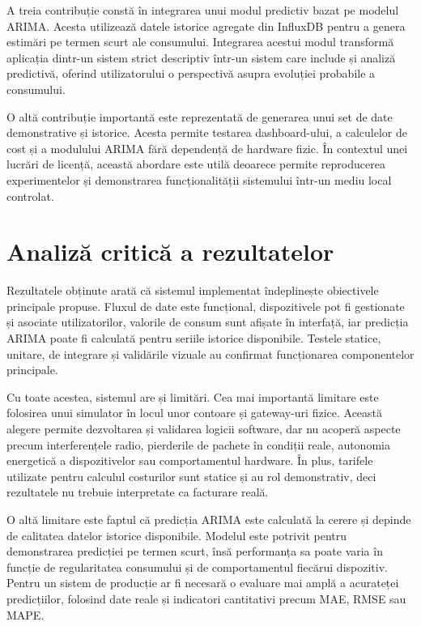A treia contribuție constă în integrarea unui modul predictiv bazat pe modelul ARIMA. Acesta utilizează datele istorice agregate din InfluxDB pentru a genera estimări pe termen scurt ale consumului. Integrarea acestui modul transformă aplicația dintr-un sistem strict descriptiv într-un sistem care include și analiză predictivă, oferind utilizatorului o perspectivă asupra evoluției probabile a consumului.

O altă contribuție importantă este reprezentată de generarea unui set de date demonstrative și istorice. Acesta permite testarea dashboard-ului, a calculelor de cost și a modulului ARIMA fără dependență de hardware fizic. În contextul unei lucrări de licență, această abordare este utilă deoarece permite reproducerea experimentelor și demonstrarea funcționalității sistemului într-un mediu local controlat.

\section{Analiză critică a rezultatelor}

Rezultatele obținute arată că sistemul implementat îndeplinește obiectivele principale propuse. Fluxul de date este funcțional, dispozitivele pot fi gestionate și asociate utilizatorilor, valorile de consum sunt afișate în interfață, iar predicția ARIMA poate fi calculată pentru seriile istorice disponibile. Testele statice, unitare, de integrare și validările vizuale au confirmat funcționarea componentelor principale.

Cu toate acestea, sistemul are și limitări. Cea mai importantă limitare este folosirea unui simulator în locul unor contoare și gateway-uri fizice. Această alegere permite dezvoltarea și validarea logicii software, dar nu acoperă aspecte precum interferențele radio, pierderile de pachete în condiții reale, autonomia energetică a dispozitivelor sau comportamentul hardware. În plus, tarifele utilizate pentru calculul costurilor sunt statice și au rol demonstrativ, deci rezultatele nu trebuie interpretate ca facturare reală.

O altă limitare este faptul că predicția ARIMA este calculată la cerere și depinde de calitatea datelor istorice disponibile. Modelul este potrivit pentru demonstrarea predicției pe termen scurt, însă performanța sa poate varia în funcție de regularitatea consumului și de comportamentul fiecărui dispozitiv. Pentru un sistem de producție ar fi necesară o evaluare mai amplă a acurateței predicțiilor, folosind date reale și indicatori cantitativi precum MAE, RMSE sau MAPE.

